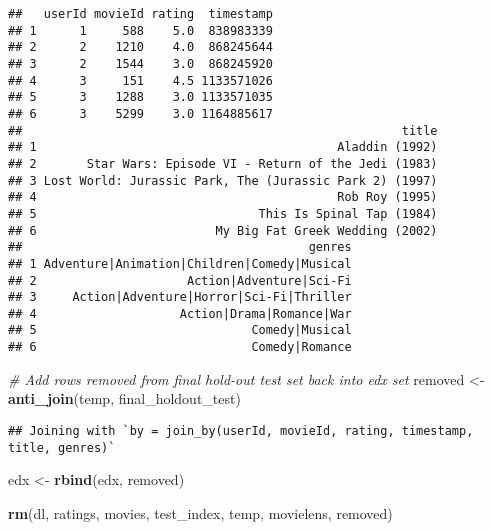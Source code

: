\documentclass[
]{article}
\newenvironment{Shaded}{\begin{snugshade}}{\end{snugshade}}
\newcommand{\CommentTok}[1]{\textcolor[rgb]{0.56,0.35,0.01}{\textit{#1}}}
\newcommand{\FunctionTok}[1]{\textcolor[rgb]{0.13,0.29,0.53}{\textbf{#1}}}
\newcommand{\NormalTok}[1]{#1}
\newcommand{\OtherTok}[1]{\textcolor[rgb]{0.56,0.35,0.01}{#1}}
\begin{document}
\begin{verbatim}
##   userId movieId rating  timestamp
## 1      1     588    5.0  838983339
## 2      2    1210    4.0  868245644
## 3      2    1544    3.0  868245920
## 4      3     151    4.5 1133571026
## 5      3    1288    3.0 1133571035
## 6      3    5299    3.0 1164885617
##                                                     title
## 1                                          Aladdin (1992)
## 2       Star Wars: Episode VI - Return of the Jedi (1983)
## 3 Lost World: Jurassic Park, The (Jurassic Park 2) (1997)
## 4                                          Rob Roy (1995)
## 5                               This Is Spinal Tap (1984)
## 6                         My Big Fat Greek Wedding (2002)
##                                        genres
## 1 Adventure|Animation|Children|Comedy|Musical
## 2                     Action|Adventure|Sci-Fi
## 3     Action|Adventure|Horror|Sci-Fi|Thriller
## 4                    Action|Drama|Romance|War
## 5                              Comedy|Musical
## 6                              Comedy|Romance
\end{verbatim}

\begin{Shaded}
\begin{Highlighting}[]
\CommentTok{\# Add rows removed from final hold{-}out test set back into edx set}
\NormalTok{removed }\OtherTok{\textless{}{-}} \FunctionTok{anti\_join}\NormalTok{(temp, final\_holdout\_test)}
\end{Highlighting}
\end{Shaded}

\begin{verbatim}
## Joining with `by = join_by(userId, movieId, rating, timestamp, title, genres)`
\end{verbatim}

\begin{Shaded}
\begin{Highlighting}[]
\NormalTok{edx }\OtherTok{\textless{}{-}} \FunctionTok{rbind}\NormalTok{(edx, removed)}

\FunctionTok{rm}\NormalTok{(dl, ratings, movies, test\_index, temp, movielens, removed)}
\end{Highlighting}
\end{Shaded}
\end{document}
